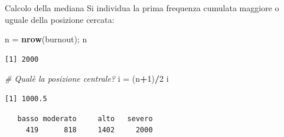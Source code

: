 \documentclass[
  ignorenonframetext,
  compress, aspectratio=149]{beamer}
\newenvironment{Shaded}{\begin{snugshade}}{\end{snugshade}}
\newcommand{\CommentTok}[1]{\textcolor[rgb]{0.56,0.35,0.01}{\textit{#1}}}
\newcommand{\DecValTok}[1]{\textcolor[rgb]{0.00,0.00,0.81}{#1}}
\newcommand{\FunctionTok}[1]{\textcolor[rgb]{0.13,0.29,0.53}{\textbf{#1}}}
\newcommand{\NormalTok}[1]{#1}
\newcommand{\OtherTok}[1]{\textcolor[rgb]{0.56,0.35,0.01}{#1}}
\newcommand{\SpecialCharTok}[1]{\textcolor[rgb]{0.81,0.36,0.00}{\textbf{#1}}}
\begin{document}
\begin{frame}[fragile]{Calcolo della mediana}
\label{calcolo-della-mediana}
Si individua la prima frequenza cumulata maggiore o uguale della
posizione cercata:

\begin{Shaded}
\begin{Highlighting}[]
\NormalTok{n }\OtherTok{=} \FunctionTok{nrow}\NormalTok{(burnout); n}
\end{Highlighting}
\end{Shaded}

\begin{verbatim}
[1] 2000
\end{verbatim}

\begin{Shaded}
\begin{Highlighting}[]
\CommentTok{\# Qual\textquotesingle{}è la posizione centrale?}
\NormalTok{i }\OtherTok{=}\NormalTok{ (n}\SpecialCharTok{+}\DecValTok{1}\NormalTok{)}\SpecialCharTok{/}\DecValTok{2}
\NormalTok{i}
\end{Highlighting}
\end{Shaded}

\begin{verbatim}
[1] 1000.5
\end{verbatim}

\begin{Shaded}
\end{Shaded}

\begin{verbatim}
   basso moderato     alto   severo 
     419      818     1402     2000 
\end{verbatim}
\end{frame}
\end{document}
